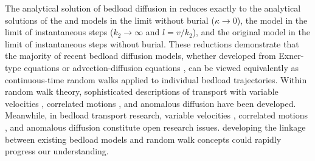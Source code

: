 The analytical solution of bedload diffusion in \DIFdelbegin {}\DIFdelend \DIFaddbegin {}\DIFaddend reduces exactly to the analytical solutions of the \citet{Lisle1998} and \citet{Lajeunesse2017} models in the limit without burial ($\kappa \rightarrow 0$), the \citet{Wu2019} model in the limit of instantaneous steps ($k_2 \rightarrow \infty$ and $l = v/k_2$), and the original \citet{Einstein1937} model in the limit of instantaneous steps without burial.
These reductions demonstrate that the majority of recent bedload diffusion models, whether developed from Exner-type equations \citep{Wu2019,Pelosi2014,Pelosi2016} or advection-diffusion equations \citep{Lisle1998,Lajeunesse2017}, can be viewed equivalently as continuous-time random walks applied to individual bedload trajectories.
Within random walk theory, sophisticated descriptions of transport with variable velocities \citep{Zaburdaev2008,Masoliver1994}, correlated motions \citep{Escaff2018,Vicsek2012a}, and anomalous diffusion \citep{Masoliver2016,Fa2014,Metzler2014} have been developed.
Meanwhile, in bedload transport research, variable velocities \citep{Lajeunesse2010,Furbish2012,Heyman2016}, correlated motions \citep{Heyman2014,Lee2018,Saletti2020}, and anomalous diffusion \citep{Fathel2016,Bradley2017,Schumer2009} constitute open research issues.
\DIFdelbegin {}\DIFdelend \DIFaddbegin {}\DIFaddend developing the linkage between existing bedload models and random walk concepts could rapidly progress our understanding.

